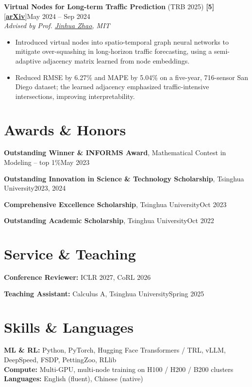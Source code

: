 \documentclass[10pt,letterpaper]{article}
\newcommand{\ulink}[2]{\href{#1}{\underline{#2}}}           %
\newcommand{\blink}[2]{[\href{#1}{\textbf{\underline{#2}}}]} %
\newcommand{\project}[3]{%
  \par{\interlinepenalty=10000 %
  {#1}\hfill #2\\
  {\itshape #3}\par}\nopagebreak\vspace{1pt}}
\newenvironment{points}{%
  \begin{itemize}[leftmargin=1.1em,itemsep=1pt,parsep=0pt,topsep=2pt,label=\textbullet,
    before={\interlinepenalty=10000}]}%
  {\end{itemize}\vspace{6pt}}
\newcommand{\row}[2]{\par #1\hfill #2\par}
\begin{document}
\project{\textbf{Virtual Nodes for Long-term Traffic Prediction} (TRB 2025) \textbf{[5]}
  \blink{https://arxiv.org/abs/2501.10048}{arXiv}}
  {May 2024 -- Sep 2024}{Advised by Prof. \ulink{https://zhaojinhua.com/}{Jinhua Zhao}, MIT}
\begin{points}
  \item Introduced virtual nodes into spatio-temporal graph neural networks to mitigate over-squashing in long-horizon traffic forecasting, using a semi-adaptive adjacency matrix learned from node embeddings.
  \item Reduced RMSE by 6.27\% and MAPE by 5.04\% on a five-year, 716-sensor San Diego dataset; the learned adjacency emphasized traffic-intensive intersections, improving interpretability.
\end{points}
\vspace{-6pt}

\section{Awards \& Honors}

\row{\textbf{Outstanding Winner \& INFORMS Award}, Mathematical Contest in Modeling -- top 1\%}{May 2023}
\row{\textbf{Outstanding Innovation in Science \& Technology Scholarship}, Tsinghua University}{2023, 2024}
\row{\textbf{Comprehensive Excellence Scholarship}, Tsinghua University}{Oct 2023}
\row{\textbf{Outstanding Academic Scholarship}, Tsinghua University}{Oct 2022}

\section{Service \& Teaching}

\row{\textbf{Conference Reviewer:} ICLR 2027, CoRL 2026}{}
\row{\textbf{Teaching Assistant:} Calculus A, Tsinghua University}{Spring 2025}

\section{Skills \& Languages}

\textbf{ML \& RL:} Python, PyTorch, Hugging Face Transformers / TRL, vLLM, DeepSpeed, FSDP, PettingZoo, RLlib\\
\textbf{Compute:} Multi-GPU, multi-node training on H100 / H200 / B200 clusters\\
\textbf{Languages:} English (fluent), Chinese (native)
\end{document}
